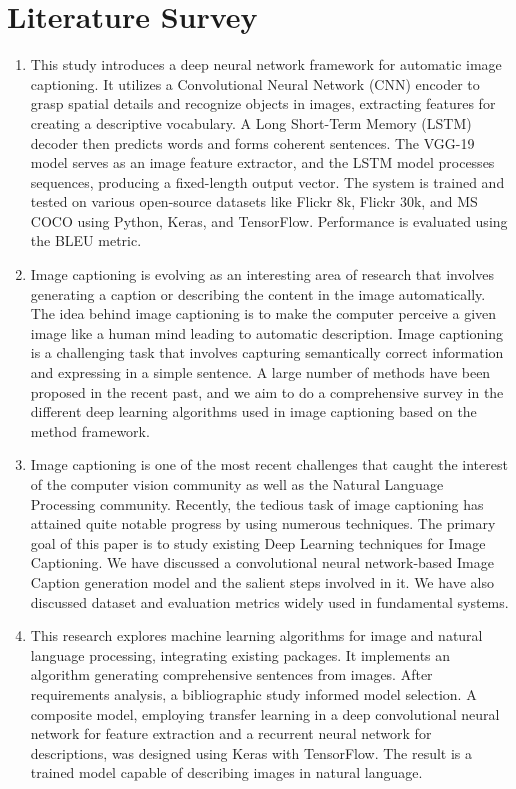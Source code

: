 \documentclass[oneside,a4paper,12pt]{report}
\begin{document}
\section{Literature Survey}
\begin{enumerate}
\item{This study introduces a deep neural network framework for automatic image captioning. It utilizes a Convolutional Neural Network (CNN) encoder to grasp spatial details and recognize objects in images, extracting features for creating a descriptive vocabulary. A Long Short-Term Memory (LSTM) decoder then predicts words and forms coherent sentences. The VGG-19 model serves as an image feature extractor, and the LSTM model processes sequences, producing a fixed-length output vector. The system is trained and tested on various open-source datasets like Flickr 8k, Flickr 30k, and MS COCO using Python, Keras, and TensorFlow. Performance is evaluated using the BLEU metric.}\cite{r1}

\item{Image captioning is evolving as an interesting area of research that involves generating a caption or describing the content in the image automatically. The idea behind image captioning is to make the computer perceive a given image like a human mind leading to automatic description. Image captioning is a challenging task that involves capturing semantically correct information and expressing in a simple sentence. A large number of methods have been proposed in the recent past, and we aim to do a comprehensive survey in the different deep learning algorithms used in image captioning based on the method framework.}\cite{r5}

\item{Image captioning is one of the most recent challenges that caught the interest of the computer vision community as well as the Natural Language Processing community. Recently, the tedious task of image captioning has attained quite notable progress by using numerous techniques. The primary goal of this paper is to study existing Deep Learning techniques for Image Captioning. We have discussed a convolutional neural network-based Image Caption generation model and the salient steps involved in it. We have also discussed dataset and evaluation metrics widely used in fundamental systems.}\cite{r3}


\item{This research explores machine learning algorithms for image and natural language processing, integrating existing packages. It implements an algorithm generating comprehensive sentences from images. After requirements analysis, a bibliographic study informed model selection. A composite model, employing transfer learning in a deep convolutional neural network for feature extraction and a recurrent neural network for descriptions, was designed using Keras with TensorFlow. The result is a trained model capable of describing images in natural language.}\cite{r2}


\end{enumerate}
\end{document}
